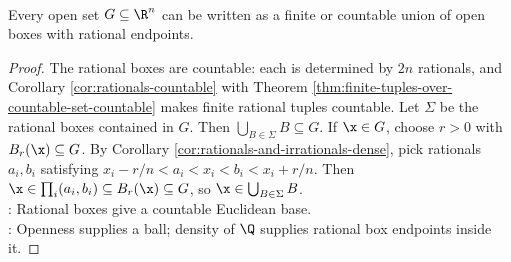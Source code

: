 \begin{lemma} \label{lem:open-sets-countable-unions-rational-boxes} \\
Every open set $G\subseteq\R^n$ can be written as a finite or countable union of open boxes with rational endpoints.
\begin{proof}
The rational boxes are countable: each is determined by $2n$ rationals, and Corollary \ref{cor:rationals-countable} with Theorem \ref{thm:finite-tuples-over-countable-set-countable} makes finite rational tuples countable. Let $\Sigma$ be the rational boxes contained in $G$. Then $\bigcup_{B\in\Sigma}B\subseteq G$. If $\x\in G$, choose $r>0$ with $B_r(\x)\subseteq G$. By Corollary \ref{cor:rationals-and-irrationals-dense}, pick rationals $a_i,b_i$ satisfying $x_i-r/n<a_i<x_i<b_i<x_i+r/n$. Then $\x\in\prod_i(a_i,b_i)\subseteq B_r(\x)\subseteq G$, so $\x\in\bigcup_{B\in\Sigma}B$.\\
: Rational boxes give a countable Euclidean base.\\
: Openness supplies a ball; density of $\Q$ supplies rational box endpoints inside it.
\end{proof}
\end{lemma}


